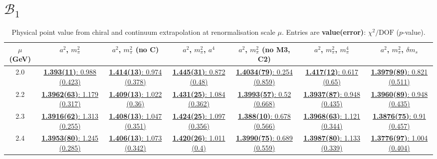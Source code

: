 \documentclass[12pt]{extarticle}
\begin{document}
\section{$\mathcal{B}_1$}
\begin{table}[h!]
\begin{center}
\begin{tabular}{|c|c|c|c|c|c|c|}
\hline
$\mu$ (GeV) & $a^2$, $m_\pi^2$& $a^2$, $m_\pi^2$ (no C)& $a^2$, $m_\pi^2$, $a^4$& $a^2$, $m_\pi^2$ (no M3, C2)& $a^2$, $m_\pi^2$, $m_\pi^4$& $a^2$, $m_\pi^2$, $\delta m_s$\\
\hline
2.0& \hyperlink{VVpAA/NPR/a2m2_20.pdf.1}{\textbf{1.393(11)}: 0.988 (0.423)} & \hyperlink{VVpAA/NPR/a2m2noC_20.pdf.1}{\textbf{1.414(13)}: 0.974 (0.378)} & \hyperlink{VVpAA/NPR/a2a4m2_20.pdf.1}{\textbf{1.445(31)}: 0.872 (0.48)} & \hyperlink{VVpAA/NPR/a2m2mcut_20.pdf.1}{\textbf{1.4034(79)}: 0.254 (0.859)} & \hyperlink{VVpAA/NPR/a2m2m4_20.pdf.1}{\textbf{1.417(12)}: 0.617 (0.65)} & \hyperlink{VVpAA/NPR/a2m2delm_20.pdf.1}{\textbf{1.3979(89)}: 0.821 (0.511)}\\
2.2& \hyperlink{VVpAA/NPR/a2m2_22.pdf.1}{\textbf{1.3962(63)}: 1.179 (0.317)} & \hyperlink{VVpAA/NPR/a2m2noC_22.pdf.1}{\textbf{1.409(13)}: 1.022 (0.36)} & \hyperlink{VVpAA/NPR/a2a4m2_22.pdf.1}{\textbf{1.431(25)}: 1.084 (0.362)} & \hyperlink{VVpAA/NPR/a2m2mcut_22.pdf.1}{\textbf{1.3993(57)}: 0.52 (0.668)} & \hyperlink{VVpAA/NPR/a2m2m4_22.pdf.1}{\textbf{1.3937(87)}: 0.948 (0.435)} & \hyperlink{VVpAA/NPR/a2m2delm_22.pdf.1}{\textbf{1.3960(89)}: 0.948 (0.435)}\\
2.3& \hyperlink{VVpAA/NPR/a2m2_23.pdf.1}{\textbf{1.3916(62)}: 1.313 (0.255)} & \hyperlink{VVpAA/NPR/a2m2noC_23.pdf.1}{\textbf{1.408(13)}: 1.047 (0.351)} & \hyperlink{VVpAA/NPR/a2a4m2_23.pdf.1}{\textbf{1.424(25)}: 1.097 (0.356)} & \hyperlink{VVpAA/NPR/a2m2mcut_23.pdf.1}{\textbf{1.388(10)}: 0.678 (0.566)} & \hyperlink{VVpAA/NPR/a2m2m4_23.pdf.1}{\textbf{1.3968(63)}: 1.121 (0.344)} & \hyperlink{VVpAA/NPR/a2m2delm_23.pdf.1}{\textbf{1.3876(75)}: 0.91 (0.457)}\\
2.4& \hyperlink{VVpAA/NPR/a2m2_24.pdf.1}{\textbf{1.3953(80)}: 1.245 (0.285)} & \hyperlink{VVpAA/NPR/a2m2noC_24.pdf.1}{\textbf{1.406(13)}: 1.073 (0.342)} & \hyperlink{VVpAA/NPR/a2a4m2_24.pdf.1}{\textbf{1.420(26)}: 1.011 (0.4)} & \hyperlink{VVpAA/NPR/a2m2mcut_24.pdf.1}{\textbf{1.3990(75)}: 0.689 (0.559)} & \hyperlink{VVpAA/NPR/a2m2m4_24.pdf.1}{\textbf{1.3987(80)}: 1.133 (0.339)} & \hyperlink{VVpAA/NPR/a2m2delm_24.pdf.1}{\textbf{1.3776(97)}: 1.004 (0.404)}\\
\hline
\end{tabular}
\caption{Physical point value from chiral and continuum extrapolation at renormalisation scale $\mu$. Entries are \textbf{value(error)}: $\chi^2/\text{DOF}$ ($p$-value).}
\end{center}
\end{table}
\end{document}
